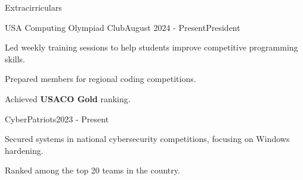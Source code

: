 \documentclass[
	11pt, %
]{resume} %
\begin{document}
\begin{rSection}{Extracirriculars}

	\begin{rSubsection}{USA Computing Olympiad Club}{August 2024 - Present}{President}{}
		\item Led weekly training sessions to help students improve competitive programming skills.
		\item Prepared members for regional coding competitions.
		\item Achieved \textbf{USACO Gold} ranking.
	\end{rSubsection}


	\begin{rSubsection}{CyberPatriots}{2023 - Present}{}{}
		\item Secured systems in national cybersecurity competitions, focusing on Windows hardening.
		\item Ranked among the top 20 teams in the country.
	\end{rSubsection}



\end{rSection}





\end{document}
